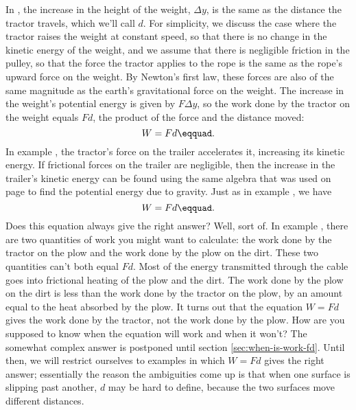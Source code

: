 In , the increase in the height of the weight,
$\Delta y$, is the same as the distance the tractor travels,
which we'll call $d$. For simplicity, we discuss the case where the
tractor raises the weight at constant speed, so that there
is no change in the kinetic energy of the weight, and we
assume that there is negligible friction in the pulley, so
that the force the tractor applies to the rope is the same
as the rope's upward force on the weight. By Newton's first
law, these forces are also of the same magnitude as the
earth's gravitational force on the weight. The increase in
the weight's potential energy is given by $F\Delta y$, so
the work done by the tractor on the weight equals $Fd$,
the product of the force and the distance moved:
\begin{equation*}
                W  =  Fd\eqquad.
\end{equation*}
In example , the tractor's force on the trailer
accelerates it, increasing its kinetic energy. If frictional
forces on the trailer are negligible, then the increase in
the trailer's kinetic energy can be found using the same
algebra that was used on page \pageref{pe-derivation} to find the
potential energy due to gravity. Just as in example , we have
\begin{equation*}
                W  =  Fd\eqquad.
\end{equation*}
Does this equation always give the right answer? Well, sort
of. In example , there are two quantities of work you
might want to calculate: the work done by the tractor on the
plow and the work done by the plow on the dirt.\label{plow-discussion} These two
quantities can't both equal $Fd$. Most of the energy transmitted
through the cable goes into frictional heating of the plow and
the dirt. The work done by the plow on the dirt is less than
the work done by the tractor on the plow, by an amount equal to
the heat absorbed by the plow. It turns out that the equation
$W=Fd$ gives the work done by the tractor, not the
work done by the plow. How are you supposed to know when the
equation will work and when it won't? The somewhat complex
answer is postponed until section \ref{sec:when-is-work-fd}. Until then, we will
restrict ourselves to examples in which $W=Fd$
gives the right answer; essentially the reason the ambiguities come
up is that when one surface is slipping past another, $d$ may be
hard to define, because the two surfaces move different distances.

